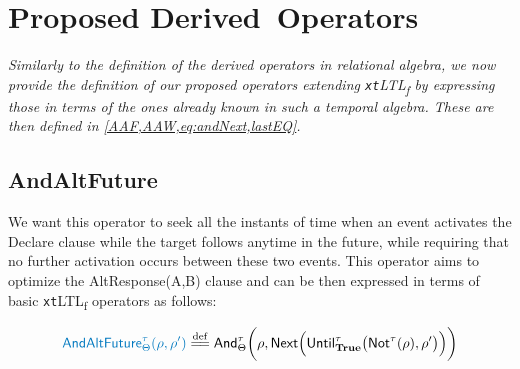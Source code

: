 \documentclass[information,article,accept,pdftex,oneauthor]{Definitions/mdpi}
\newcommand{\eqdef}{\overset{\mathrm{def}}{=\joinrel=}}
\begin{document}



\section{Proposed Derived~Operators}\label{sec:opdef}
\textit{{Similarly} %
 to the definition of the derived operators in relational algebra, we now provide the definition of our proposed operators extending \texttt{xt}LTL\textsubscript{f} by expressing those in terms of the ones already known in such a temporal algebra. These are then defined in \cref{AAF,AAW,eq:andNext,lastEQ}. %
}


\subsection{{AndAltFuture} %
} 

We want this operator to seek all the instants of time when an event activates the Declare clause while the target  follows anytime in the future, while requiring that no further activation occurs between these two events. This operator aims  to optimize the \textsf{AltResponse(A,B)} clause and can be then expressed in terms of basic \texttt{xt}LTL\textsubscript{f} operators as {follows:} %

\begin{equation}\label{AAF}
{\color{oceanboatblue}\textsf{AndAltFuture}^\tau_\Theta(\rho,\rho')}\eqdef\textsf{And}^\tau_\Theta\bigg(\rho,\textsf{Next}\Big(\textsf{Until}^\tau_\textbf{True}\big(\textsf{Not}^\tau(\rho),\rho'\big)\Big)\bigg)
\end{equation}
\end{document}
